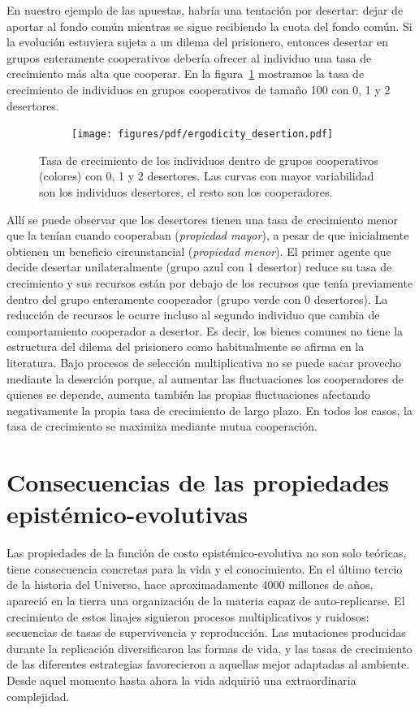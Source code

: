 \documentclass[a4paper,11pt]{book}
\theoremstyle{definition}
\begin{document}
En nuestro ejemplo de las apuestas, habría una tentación por desertar: dejar de aportar al fondo común mientras se sigue recibiendo la cuota del fondo común.
%
Si la evolución estuviera sujeta a un dilema del prisionero, entonces desertar en grupos enteramente cooperativos debería ofrecer al individuo una tasa de crecimiento más alta que cooperar.
%
En la figura~\ref{fig:desert} mostramos la tasa de crecimiento de individuos en grupos cooperativos de tamaño 100 con 0, 1 y 2 desertores.
%
\begin{figure}[ht!]
\centering
 \begin{subfigure}[c]{0.45\textwidth} \centering
  \texttt{[image: figures/pdf/ergodicity\_desertion.pdf]}
  \end{subfigure}
 \caption{
Tasa de crecimiento de los individuos dentro de grupos cooperativos (colores) con 0, 1 y 2 desertores. Las curvas con mayor variabilidad son los individuos desertores, el resto son los cooperadores.}
 \label{fig:desert}
 \end{figure}
Allí se puede observar que los desertores tienen una tasa de crecimiento menor que la tenían cuando cooperaban (\emph{propiedad mayor}), a pesar de que inicialmente obtienen un beneficio circunstancial (\emph{propiedad menor}).
%
El primer agente que decide desertar unilateralmente (grupo azul con 1 desertor) reduce su tasa de crecimiento y sus recursos están por debajo de los recursos que tenía previamente dentro del grupo enteramente cooperador (grupo verde con 0 desertores).
%
La reducción de recursos le ocurre incluso al segundo individuo que cambia de comportamiento cooperador a desertor.
%
Es decir, los bienes comunes no tiene la estructura del dilema del prisionero como habitualmente se afirma en la literatura.
%
Bajo procesos de selección multiplicativa no se puede sacar provecho mediante la deserción porque, al aumentar las fluctuaciones los cooperadores de quienes se depende, aumenta también las propias fluctuaciones afectando negativamente la propia tasa de crecimiento de largo plazo.
%
En todos los casos, la tasa de crecimiento se maximiza mediante mutua cooperación.


\section{Consecuencias de las propiedades epistémico-evolutivas}

Las propiedades de la función de costo epistémico-evolutiva no son solo teóricas, tiene consecuencia concretas para la vida y el conocimiento.
%
En el último tercio de la historia del Universo, hace aproximadamente 4000 millones de años, apareció en la tierra una organización de la materia capaz de auto-replicarse.
%
El crecimiento de estos linajes siguieron procesos multiplicativos y ruidosos: secuencias de tasas de supervivencia y reproducción.
%
Las mutaciones producidas durante la replicación diversificaron las formas de vida, y las tasas de crecimiento de las diferentes estrategias favorecieron a aquellas mejor adaptadas al ambiente.
%
Desde aquel momento hasta ahora la vida adquirió una extraordinaria complejidad.
\end{document}
